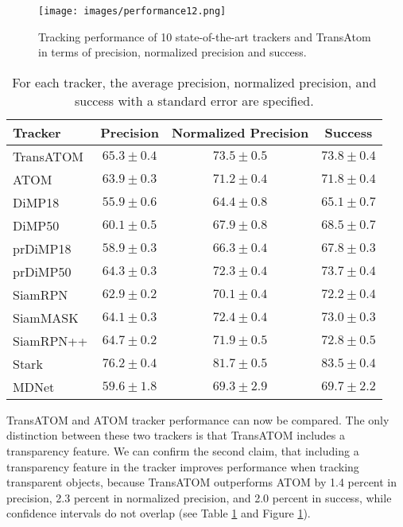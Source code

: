 \begin{figure}[h]
\caption{Tracking performance of 10 state-of-the-art trackers and TransAtom in terms of precision, normalized precision and success.}
\label{fig:fig1}
\centering
\texttt{[image: images/performance12.png]}
\end{figure}


\begin{table}[h]
\centering
\caption{For each tracker, the average precision, normalized precision, and success with a standard error are specified.}
\label{tab:my-table4}
\begin{tabular}{@{}lccc@{}}
\toprule
Tracker           & Precision  & Normalized Precision & Success    \\ \midrule
TransATOM      & $65.3 \pm 0.4$      & $73.5 \pm 0.5$               & $73.8\pm 0.4$      \\
ATOM           & $63.9 \pm 0.3$       & $71.2   \pm 0.4$             & $71.8 \pm 0.4$     \\
DiMP18         & $55.9 \pm 0.6$      & $64.4  \pm 0.8$              & $65.1\pm 0.7$      \\
DiMP50         & $60.1 \pm 0.5$      & $67.9   \pm 0.8$             & $68.5 \pm 0.7$     \\
prDiMP18       & $58.9 \pm 0.3$      & $66.3\pm 0.4$                & $67.8\pm 0.3$      \\
prDiMP50       & $64.3 \pm 0.3$       & $72.3 \pm 0.4$               & $73.7\pm 0.4$      \\
SiamRPN        & $62.9 \pm 0.2$      & $70.1 \pm 0.4$               & $72.2 \pm 0.4$     \\
SiamMASK       & $64.1 \pm 0.3$      & $72.4\pm 0.4$                & $73.0\pm 0.3$      \\
SiamRPN++   & $64.7 \pm 0.2$      & $71.9 \pm 0.5$               & $72.8\pm 0.5$      \\
Stark          & $76.2 \pm 0.4$      & $81.7 \pm 0.5$               & $83.5 \pm 0.4$   \\
MDNet          & $59.6  \pm 1.8$     & $69.3 \pm 2.9$               & $69.7\pm 2.2$      \\ \bottomrule
\end{tabular}
\end{table}


TransATOM and ATOM tracker performance can now be compared. The only distinction between these two trackers is that TransATOM includes a transparency feature. We can confirm the second claim, that including a transparency feature in the tracker improves performance when tracking transparent objects, because TransATOM outperforms ATOM by 1.4 percent in precision, 2.3 percent in normalized precision, and 2.0 percent in success, while confidence intervals do not overlap (see Table \ref{tab:my-table4} and Figure \ref{fig:fig1}).


